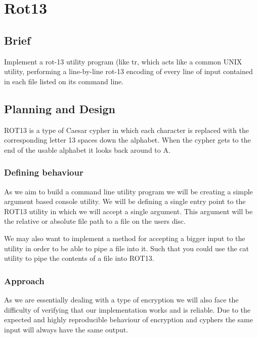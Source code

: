 \section{Rot13}

\subsection{Brief}

Implement a rot-13 utility program (like tr, which acts like a common UNIX utility, performing a line-by-line rot-13 encoding of every line of input contained in each file listed on its command line.

\subsection{Planning and Design}

ROT13 is a type of Caesar cypher in which each character is replaced with the corresponding letter 13 spaces down the alphabet. When the cypher gets to the end of the usable alphabet it looks back around to A.

\subsubsection{Defining behaviour}

As we aim to build a command line utility program we will be creating a simple
argument based console utility. We will be defining a single entry point to the
ROT13 utility in which we will accept a single argument. This argument will be
the relative or absolute file path to a file on the users disc.

We may also want to implement a method for accepting a bigger input to the
utility in order to be able to pipe a file into it. Such that you could use
the cat utility to pipe the contents of a file into ROT13.

\bigskip



\subsubsection{Approach}

As we are essentially dealing with a type of encryption we will also face the
difficulty of verifying that our implementation works and is reliable. Due to
the expected and highly reproducible behaviour of encryption and cyphers the same
input will always have the same output.

